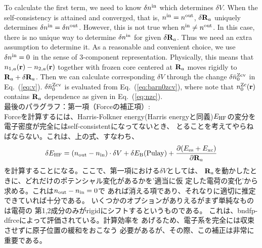 \documentclass[a4paper,10pt,aip,onecolumn,amsmath,amssymb,floatfix,rmp]{revtex4-1}
\newcommand{\bfr}{{\bf r}}
\newcommand{\bfR}{{\bf R}}
\newcommand{\req}[1]{\mbox{Eq.~\!(\ref{#1})}}
\def\nzc{n^{\rm Zc}}
\def\barnzcv{\bar{n}^{\rm Zcv}}
\def\nin{n^{\rm in}}
\def\nout{n^{\rm out}}
\def\Vin{V}
\begin{document}
\begin{widetext}
To calculate the first term, we need to know $\delta \nin$ which determines
$\delta \Vin$. When the self-consistency is attained and converged,
that is, $\nin=\nout$, $\delta \bfR_a$ uniquely determines
$\delta \nin=\delta \nout$.
However, this is not true when $\nin \ne \nout$.
In this case, there is no unique way to determine $\delta \nin$
for given $\delta \bfR_a$. Thus we need an extra assumption to
determine it. As a reasonable and convenient choice,
we use $\delta \nin=0$ in the sense of 3-component representation. 
Physically, this means that $n_{1,a}(\bfr)-n_{2,a}(\bfr)$  
together with frozen core centered at $\bfR_a$
moves rigidly to $\bfR_a+\delta\bfR_a$.
Then we can calculate corresponding $\delta \Vin$ through the change
$\delta \barnzcv_0$ in \req{eq:v}. $\delta \barnzcv_0$ is evaluated from
\req{eq:barn0zcv},
where note that $\nzc_0(\bfr)$ contains $\bfR_a$ dependence as
given in \req{eq:nzc}.\\


最後のパラグラフ：第一項（Forceの補正項）:\\
Forceを計算するには、Harris-Folkner energy(Harris energyと同義)$E_{\rm HF}$の変分を
電子密度が完全にはself-consistentになってないとき、
とることを考えてやらねばならない。これは、上の式、すなわち、
\begin{eqnarray}
\delta E_{\rm HF} = (n_{\rm out}-n_{\rm in})\cdot \delta V
+\delta E_{\rm B}({\rm Pulay}) 
+\frac{\partial (E_{\rm es} + E_{\rm xc})}{\partial \bfR_a}
\end{eqnarray}
を計算することになる。ここで、第一項における$\delta V$としては、
$\bfR_a$を動かしたときに、どれだけのポテンシャル変化があるかを'適当に仮
定した電荷の変化'から求める。これは$n_{\rm out}-n_{\rm in}=0$で
あれば消える項であり、それなりに適切に推定できていれば十分である。
いくつかのオプションがありえるがまず単純なものは電荷の
第1,2成分のみがrigidにシフトするというものである。
これは、bndfp-dfrceによって評価されている。計算効率を
あげるため、電子系を完全には収束させずに原子位置の緩和をおこなう
必要があるが、その際、この補正は非常に重要である。



\end{widetext}
\end{document}
